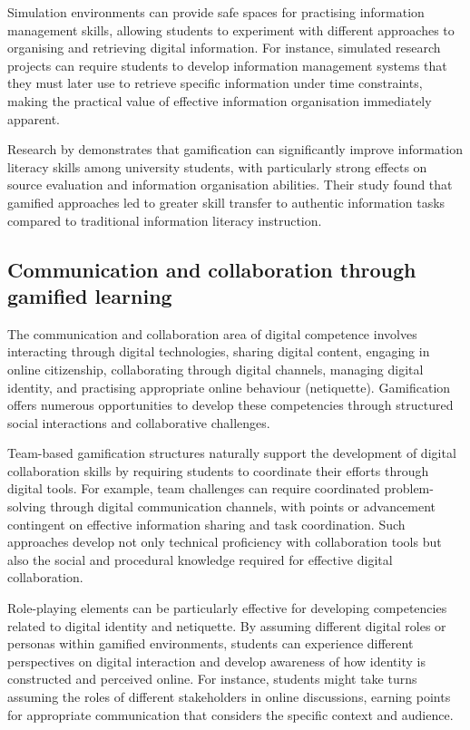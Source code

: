 \documentclass[cte]{acnsart}
\begin{document}
Simulation environments can provide safe spaces for practising information management skills, allowing students to experiment with different approaches to organising and retrieving digital information. For instance, simulated research projects can require students to develop information management systems that they must later use to retrieve specific information under time constraints, making the practical value of effective information organisation immediately apparent.

Research by \citet{Flores-Bueno2021} demonstrates that gamification can significantly improve information literacy skills among university students, with particularly strong effects on source evaluation and information organisation abilities. Their study found that gamified approaches led to greater skill transfer to authentic information tasks compared to traditional information literacy instruction.

\subsection{Communication and collaboration through gamified learning}

The communication and collaboration area of digital competence involves interacting through digital technologies, sharing digital content, engaging in online citizenship, collaborating through digital channels, managing digital identity, and practising appropriate online behaviour (netiquette). Gamification offers numerous opportunities to develop these competencies through structured social interactions and collaborative challenges.

Team-based gamification structures naturally support the development of digital collaboration skills by requiring students to coordinate their efforts through digital tools. For example, team challenges can require coordinated problem-solving through digital communication channels, with points or advancement contingent on effective information sharing and task coordination. Such approaches develop not only technical proficiency with collaboration tools but also the social and procedural knowledge required for effective digital collaboration.

Role-playing elements can be particularly effective for developing competencies related to digital identity and netiquette. By assuming different digital roles or personas within gamified environments, students can experience different perspectives on digital interaction and develop awareness of how identity is constructed and perceived online. For instance, students might take turns assuming the roles of different stakeholders in online discussions, earning points for appropriate communication that considers the specific context and audience.
\end{document}
